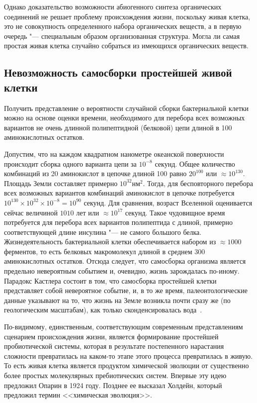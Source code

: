 \documentclass[12pt,a4paper,oneside]{book}
\begin{document}
Однако доказательство возможности абиогенного синтеза органических соединений не решает проблему происхождения жизни, поскольку живая клетка, это не совокупность определенного набора органических веществ, а в первую очередь "--- специальным образом организованная структура. Могла ли самая простая живая клетка случайно собраться из имеющихся органических веществ. 

\subsection{Невозможность самосборки простейшей живой клетки}

Получить представление о вероятности случайной сборки бактериальной клетки можно на основе оценки времени, необходимого для перебора всех возможных вариантов не очень длинной полипептидной (белковой) цепи длиной в 100 аминокислотных остатков.

Допустим, что на каждом квадратном нанометре океанской поверхности происходит сборка одного варианта цепи за $10^{-8}$ секунд. Общее количество комбинаций из 20 аминокислот в цепочке длиной 100 равно $20^{100}$ или $\approx 10^{130}$. Площадь Земли составляет примерно $10^{32} \text{нм}^2$. Тогда, для бесповторного перебора всех возможных вариантов комбинаций аминокислот в цепочке потребуется $10^{130} \times 10^{32} \times 10^{-8} = 10^{90}$ секунд. Для сравнения, возраст Вселенной оценивается сейчас величиной $1010$ лет или $\approx 10^{17}$ секунд. Такое чудовищное время потребуется для перебора всех вариантов полипептида с длиной, примерно соответствующей длине инсулина "--- не самого большого белка. Жизнедеятельность бактериальной клетки обеспечивается набором из $\approx 1000$ ферментов, то есть белковых макромолекул длиной в среднем 300 аминокислотных остатков. Отсюда следует, что самосборка организма является предельно невероятным событием и, очевидно, жизнь зарождалась по-иному. Парадокс Кастлера состоит в том, что самосборка простейшей клетки представляет собой невероятное событие, и, в то же время, палеонтологические данные указывают на то, что жизнь на Земле возникла почти сразу же (по геологическим масштабам), как только сконденсировалась вода~\cite{Kastler1967}.

По-видимому, единственным, соответствующим современным представлениям сценарием происхождения жизни, является формирование простейшей пробиотической системы, которая в результате постепенного нарастания сложности превратилась на каком-то этапе этого процесса превратилась в живую. То есть живая клетка является продуктом химической эволюции от существенно более простых молекулярных пребиотических систем. Впервые эту идею предложил Опарин в 1924 году. Позднее ее высказал Холдейн, который предложил термин <<химическая эволюция>>.
\end{document}

